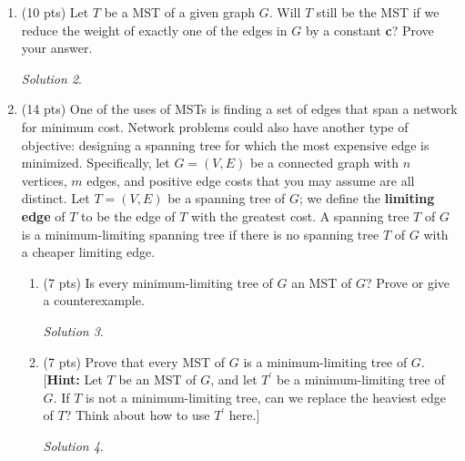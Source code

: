 \documentclass[12pt]{article}
\theoremstyle{remark}
\newtheorem*{solution}{Solution}
\begin{document}
\begin{enumerate}
\begin{enumerate}[label=(\alph*)]
\begin{solution}
\end{solution}
 

\end{enumerate}

\pagebreak

\item (10 pts) Let $T$ be a MST of a given graph $G$. Will $T$ still be the MST if we reduce the weight of exactly one of the edges in $G$ by a constant \textbf{c}? Prove your answer.
\begin{solution}

\end{solution}

\pagebreak
\item (14 pts) One of the uses of MSTs is finding a set of edges that span a network for minimum cost. Network problems could also have another type of objective: designing a spanning tree for which the most expensive edge is minimized. Specifically, let $G = (V, E)$ be a connected graph with $n$ vertices, $m$ edges, and positive edge costs that you may assume are all distinct. Let $T = (V, E)$ be a spanning tree of $G$; we define the \textbf{limiting edge} of $T$ to be the edge of $T$ with the greatest cost.
A spanning tree $T$ of $G$ is a minimum-limiting spanning tree if there is no spanning tree $T$ of $G$ with a cheaper limiting edge.
\begin{enumerate}
\item (7 pts) Is every minimum-limiting tree of $G$ an MST of $G$? Prove or give a counterexample.
\begin{solution}

\end{solution}

\pagebreak
\item (7 pts) Prove that every MST of $G$ is a minimum-limiting tree of $G$. [\textbf{Hint:} Let $T$ be an MST of $G$, and let $T^{\prime}$ be a minimum-limiting tree of $G$. If $T$ is not a minimum-limiting tree, can we replace the heaviest edge of $T$? Think about how to use $T^{\prime}$ here.]

\begin{solution}

\end{solution}

\end{enumerate}

\end{enumerate}
\end{document}
